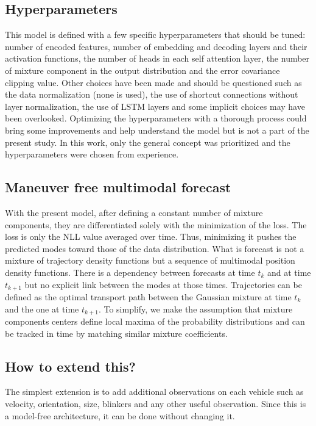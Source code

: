 \documentclass[a4paper, 10pt, conference]{ieeeconf}      %
\begin{document}
\subsection{Hyperparameters}

This model is defined with a few specific hyperparameters that should be tuned: number of encoded features, number of
embedding and decoding layers and their activation functions, the number of heads in each self attention layer,
the number of mixture component in the output distribution and the error covariance clipping value.
Other choices have been made and should be questioned such as the data normalization (none is used),
the use of shortcut connections without layer normalization, the use of LSTM layers and some implicit choices
may have been overlooked.
Optimizing the hyperparameters with a thorough process could bring some improvements and
help understand the model but is not a part of the present study.
In this work, only the general concept was prioritized and the hyperparameters were chosen from experience.


\subsection{Maneuver free multimodal forecast}

With the present model, after defining a constant number of mixture components, they are differentiated solely with
the minimization of the loss.
The loss is only the NLL value averaged over time.
Thus, minimizing it pushes the predicted modes toward those of the data distribution.
What is forecast is not a mixture of trajectory density functions but a sequence of multimodal position
density functions.
There is a dependency between forecasts at time $t_k$ and at time $t_{k+1}$ but no explicit link between the modes
at those times.
Trajectories can be defined as the optimal transport path between the Gaussian mixture at time $t_k$ and the one at
time $t_{k+1}$.
To simplify, we make the assumption that mixture components centers define local maxima of the probability distributions
and can be tracked in time by matching similar mixture coefficients.

\subsection{How to extend this?}


The simplest extension is to add additional observations on each vehicle such as velocity, orientation, size, blinkers
and any other useful observation.
Since this is a model-free architecture, it can be done without changing it.
\end{document}
